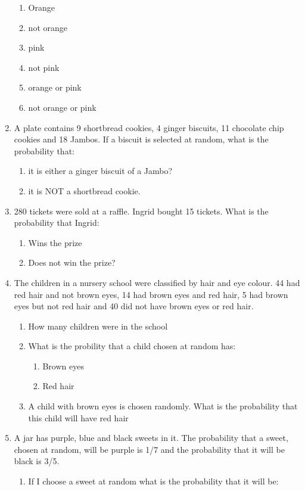 \documentclass[10pt,a4paper,titlepage,twoside,openright]{report}
\begin{document}
\begin{enumerate}
\begin{enumerate}
	\item Orange 
	\item not orange 
	\item pink 
	\item not pink
	\item orange or pink
	\item not orange or pink 
	\end{enumerate}
\item A plate contains 9 shortbread cookies, 4 ginger biscuits, 11 chocolate chip cookies and 18 Jambos. If a biscuit is selected at random, what is the probability that:
	\begin{enumerate}
	\item it is either a ginger biscuit of a Jambo? 
	\item it is NOT a shortbread cookie.
	\end{enumerate}
\item 280 tickets were sold at a raffle. Ingrid bought 15 tickets. What is the probability that Ingrid: 
	\begin{enumerate}
	\item Wins the prize 
	\item Does not win the prize?
	\end{enumerate}
\item The children in a nursery school were classified by hair and eye colour. 44 had red hair and not brown eyes, 14 had brown eyes and red hair, 5 had brown eyes but not red hair and 40 did not have brown eyes or red hair. 
	\begin{enumerate}
	\item How many children were in the school
	\item What is the probility that a child chosen at random has: 
		\begin{enumerate}
		\item Brown eyes 
		\item Red hair 
		\end{enumerate}
	\item A child with brown eyes is chosen randomly. What is the probability that this child will have red hair 
	\end{enumerate}
\item A jar has purple, blue and black sweets in it. The probability that a sweet, chosen at random, will be purple is 1/7 and the probability that it will be black is 3/5. 
	\begin{enumerate}
	\item If I choose a sweet at random what is the probability that it will be: 

\end{enumerate}
\end{enumerate}
\end{document}
